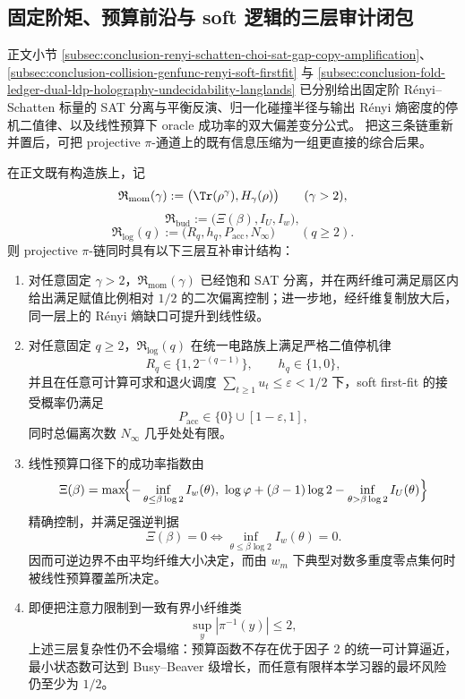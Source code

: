 \subsection{固定阶矩、预算前沿与 soft 逻辑的三层审计闭包}

正文小节 \ref{subsec:conclusion-renyi-schatten-choi-sat-gap-copy-amplification}、
\ref{subsec:conclusion-collision-genfunc-renyi-soft-firstfit}
与 \ref{subsec:conclusion-fold-ledger-dual-ldp-holography-undecidability-langlands}
已分别给出固定阶 Rényi--Schatten 标量的 SAT 分离与平衡反演、归一化碰撞半径与输出 Rényi 熵密度的停机二值律、以及线性预算下 oracle 成功率的双大偏差变分公式。
把这三条链重新并置后，可把 projective \(\pi\)-通道上的既有信息压缩为一组更直接的综合后果。

\begin{theorem}\label{thm:derived-pi-moment-budget-logic-three-layer-closure}
在正文既有构造族上，记
\[
\mathfrak R_{\mathrm{mom}}(\gamma):=\bigl(\Tr(\rho^\gamma),H_\gamma(\rho)\bigr)
\qquad (\gamma>2),
\]
\[
\mathfrak R_{\mathrm{bud}}:=\bigl(\Xi(\beta),I_U,I_w\bigr),
\]
\[
\mathfrak R_{\mathrm{log}}(q):=\bigl(R_q,h_q,P_{\mathrm{acc}},N_\infty\bigr)
\qquad (q\ge 2).
\]
则 projective \(\pi\)-链同时具有以下三层互补审计结构：
\begin{enumerate}
\normalfont
  \item 对任意固定 \(\gamma>2\)，\(\mathfrak R_{\mathrm{mom}}(\gamma)\) 已经饱和 SAT 分离，并在两纤维可满足扇区内给出满足赋值比例相对 \(1/2\) 的二次偏离控制；进一步地，经纤维复制放大后，同一层上的 Rényi 熵缺口可提升到线性级。
  \item 对任意固定 \(q\ge 2\)，\(\mathfrak R_{\mathrm{log}}(q)\) 在统一电路族上满足严格二值停机律
  \[
  R_q\in\{1,2^{-(q-1)}\},
  \qquad
  h_q\in\{1,0\},
  \]
  并且在任意可计算可求和退火调度
  \(
  \sum_{t\ge 1}u_t\le \varepsilon<1/2
  \)
  下，soft first-fit 的接受概率仍满足
  \[
  P_{\mathrm{acc}}\in \{0\}\cup[1-\varepsilon,1],
  \]
  同时总偏离次数 \(N_\infty\) 几乎处处有限。
  \item 线性预算口径下的成功率指数由
  \[
  \Xi(\beta)
  =
  \max\!\Bigl\{
  -\inf_{\theta\le \beta\log 2}I_w(\theta),\
  \log\varphi+(\beta-1)\log 2-\inf_{\theta>\beta\log 2}I_U(\theta)
  \Bigr\}
  \]
  精确控制，并满足强逆判据
  \[
  \Xi(\beta)=0
  \iff
  \inf_{\theta\le \beta\log 2}I_w(\theta)=0.
  \]
  因而可逆边界不由平均纤维大小决定，而由 \(w_m\) 下典型对数多重度零点集何时被线性预算覆盖所决定。
  \item 即便把注意力限制到一致有界小纤维类
  \[
  \sup_y|\pi^{-1}(y)|\le 2,
  \]
  上述三层复杂性仍不会塌缩：预算函数不存在优于因子 \(2\) 的统一可计算逼近，最小状态数可达到 Busy--Beaver 级增长，而任意有限样本学习器的最坏风险仍至少为 \(1/2\)。
\end{enumerate}
\end{theorem}

